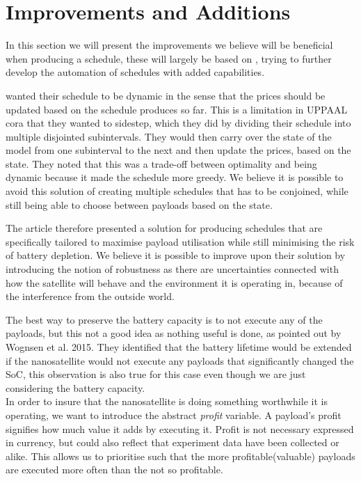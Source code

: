 \section{Improvements and Additions}
In this section we will present the improvements we believe will be beneficial when producing a schedule, these will largely be based on \cite{gomx3}, trying to further develop the automation of schedules with added capabilities.

\cite{gomx3} wanted their schedule to be dynamic in the sense that the prices should be updated based on the schedule produces so far. This is a limitation in UPPAAL \gls {cora} that they wanted to sidestep, which they did by dividing their schedule into multiple disjointed subintervals. They would then carry over the state of the model from one subinterval to the next and then update the prices, based on the state. They noted that this was a trade-off between optimality and being dynamic because it made the schedule more greedy. We believe it is possible to avoid this solution of creating multiple schedules that has to be conjoined, while still being able to choose between payloads based on the state. %

The article therefore presented a solution for producing schedules that are specifically tailored to maximise payload utilisation while still minimising the risk of battery depletion. We believe it is possible to improve upon their solution by introducing the notion of robustness as there are uncertainties connected with how the satellite will behave and the environment it is operating in, because of the interference from the outside world.

The best way to preserve the battery capacity is to not execute any of the payloads, but this not a good idea as nothing useful is done, as pointed out by Wognsen et al. 2015\cite{score_function}. They identified that the battery lifetime would be extended if the nanosatellite would not execute any payloads that significantly changed the SoC, this observation is also true for this case even though we are just considering the battery capacity.\\
In order to insure that the nanosatellite is doing something worthwhile it is operating, we want to introduce the abstract \textit{profit} variable. A payload's profit signifies how much value it adds by executing it. Profit is not necessary expressed in currency, but could also reflect that experiment data have been collected or alike. This allows us to prioritise such that the more profitable(valuable) payloads are executed more often than the not so profitable.

